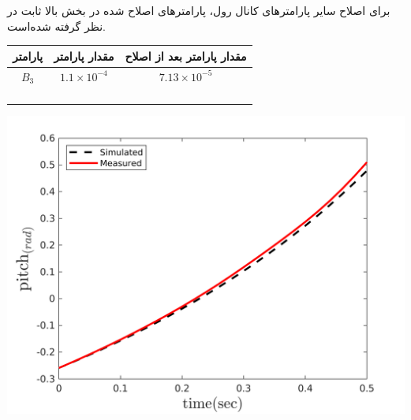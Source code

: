 

برای اصلاح سایر پارامترهای کانال رول، پارامترهای اصلاح شده در بخش بالا ثابت در نظر گرفته شده‌است.



\begin{minipage}[H]{\linewidth}
	\hfill
	\begin{minipage}[b]{0.49\linewidth}
		\centering
		\begin{tabular}{ccc}\hline
			پارامتر & مقدار پارامتر  & مقدار پارامتر بعد از اصلاح
			\\ \hline
			$B_3$  & $1.1\times10^{-4}$ & $7.13\times10^{-5}$ \\\\
			\\\\\\
		\end{tabular}
	\end{minipage}
	\begin{minipage}[b]{0.48\linewidth}
		\centering
		\includegraphics[width=1\linewidth]{../Figures/RCP/pitch_parameter_estimation/RCP_pitch_S1.png}
	\end{minipage}
\end{minipage}



